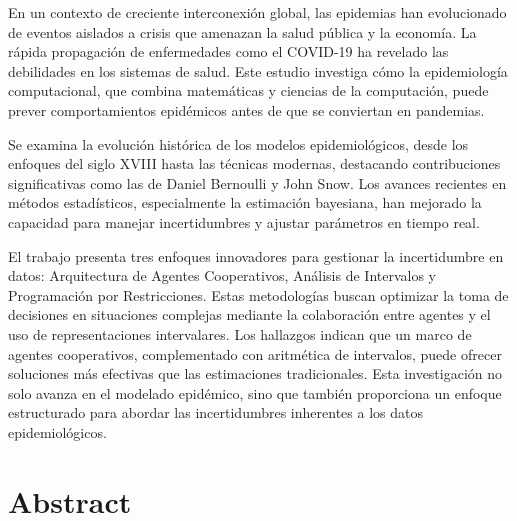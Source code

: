 \documentclass{article}
\begin{document}
En un contexto de creciente interconexión global, las epidemias han evolucionado de eventos aislados a crisis que amenazan la salud pública y la economía. La rápida propagación de enfermedades como el COVID-19 ha revelado las debilidades en los sistemas de salud. Este estudio investiga cómo la epidemiología computacional, que combina matemáticas y ciencias de la computación, puede prever comportamientos epidémicos antes de que se conviertan en pandemias.

Se examina la evolución histórica de los modelos epidemiológicos, desde los enfoques del siglo XVIII hasta las técnicas modernas, destacando contribuciones significativas como las de Daniel Bernoulli y John Snow. Los avances recientes en métodos estadísticos, especialmente la estimación bayesiana, han mejorado la capacidad para manejar incertidumbres y ajustar parámetros en tiempo real.

El trabajo presenta tres enfoques innovadores para gestionar la incertidumbre en datos: Arquitectura de Agentes Cooperativos, Análisis de Intervalos y Programación por Restricciones. Estas metodologías buscan optimizar la toma de decisiones en situaciones complejas mediante la colaboración entre agentes y el uso de representaciones intervalares. Los hallazgos indican que un marco de agentes cooperativos, complementado con aritmética de intervalos, puede ofrecer soluciones más efectivas que las estimaciones tradicionales. Esta investigación no solo avanza en el modelado epidémico, sino que también proporciona un enfoque estructurado para abordar las incertidumbres inherentes a los datos epidemiológicos.

\newpage

\section*{ \textbf{ Abstract }     } 
\end{document}
